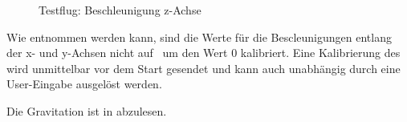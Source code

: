 \begin{figure}[ht!]
\vspace{0.25cm}
\begin{center}
\caption{Testflug: Beschleunigung z-Achse}
\label{fig:Flightaz}
\end{center}

\vspace{0.25cm}

\end{figure}












\FloatBarrier
{}









Wie  entnommen werden kann, sind die Werte für die Bescleunigungen entlang der x- und y-Achsen nicht auf \bzw\ um den Wert 0 kalibriert. Eine Kalibrierung des \Quad[s] wird unmittelbar vor dem Start gesendet und kann auch unabhängig durch eine User-Eingabe ausgelöst werden.

Die Gravitation ist in  abzulesen.

